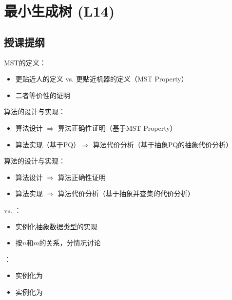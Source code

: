 \chapter{最小生成树 (L14)}

\section*{授课提纲}

\nid MST的定义：
\begin{itemize}
    \item 更贴近人的定义 vs. 更贴近机器的定义（MST Property）
    \item 二者等价性的证明
\end{itemize}

\nid {}算法的设计与实现：
\begin{itemize}
    \item {}算法设计 $\Rightarrow$ 算法正确性证明（基于MST Property）
    \item {}算法实现（基于PQ）$\Rightarrow$ 算法代价分析（基于抽象PQ的抽象代价分析）
\end{itemize}

\nid {}算法的设计与实现：
\begin{itemize}
    \item {}算法设计 $\Rightarrow$ 算法正确性证明
    \item {}算法实现 $\Rightarrow$ 算法代价分析（基于抽象并查集的代价分析）
\end{itemize}

\nid {} vs. ：
\begin{itemize}
    \item 实例化抽象数据类型的实现
    \item 按$n$和$m$的关系，分情况讨论
\end{itemize}

\nid {}：
\begin{itemize}
    \item 实例化为
    \item 实例化为
\end{itemize}

